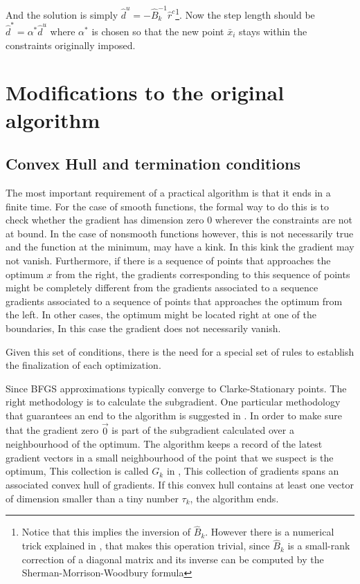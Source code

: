 And the solution is simply $\hat{d}^u = -\hat{B}_k^{-1}\hat{r}^c$\footnote{Notice that this implies the inversion of $\hat{B}_k$. However there is a numerical trick explained in \citep{nocedal}, that makes this operation trivial, since $\hat{B}_k$ is a small-rank correction of a diagonal matrix and its inverse can be computed by the Sherman-Morrison-Woodbury formula}. Now the step length should be $\hat{d}^* = \alpha^* \hat{d}^u$ where $\alpha^*$ is chosen so that the new point $\bar{x}_i$ stays within the constraints originally imposed.

\chapter{Modifications to the original algorithm}

\section{Convex Hull and termination conditions}

The most important requirement of a practical algorithm is that it ends in a finite time. For the case of smooth functions, the formal way to do this is to check whether the gradient has dimension zero $0$ wherever the constraints are not at bound. In the case of nonsmooth functions however, this is not necessarily true and the function at the minimum, may have a kink. In this kink the gradient may not vanish. Furthermore, if there is a sequence of points that approaches the optimum $x$ from the right, the gradients corresponding to this sequence of points might be completely different from the gradients associated to a sequence gradients associated to a sequence of points that approaches the optimum from the left. In other cases, the optimum might be located right at one of the boundaries, In this case the gradient does not necessarily vanish.

Given this set of conditions, there is the need for a special set of rules to establish the finalization of each optimization.

Since BFGS approximations typically converge to Clarke-Stationary points. The right methodology is to calculate the subgradient. One particular methodology that guarantees an end to the algorithm is suggested in \citep{overtonlewis}. In order to make sure that the gradient zero $\vec{0}$ is part of the subgradient calculated over a neighbourhood of the optimum.
The algorithm keeps a record of the latest gradient vectors in a small neighbourhood of the point that we suspect is the optimum, This collection is called $G_k$ in \citep{overtonlewis}, This collection of gradients spans an associated convex hull of gradients. If this convex hull contains at least one vector of dimension smaller than a tiny number $\tau_k$, the algorithm ends.

